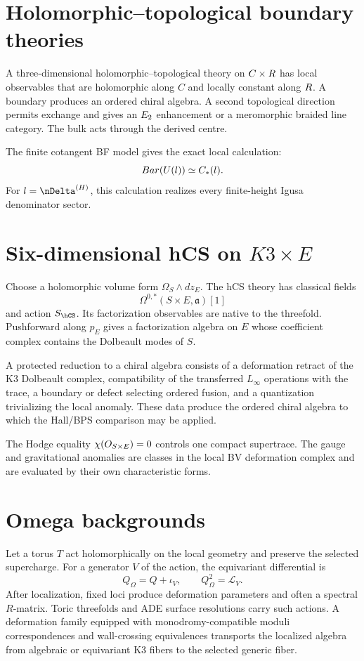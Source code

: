 \chapter{Holomorphic--topological boundary theories}
A three-dimensional holomorphic--topological theory on $C\times R$ has local observables that are holomorphic along $C$ and locally constant along $R$. A boundary produces an ordered chiral algebra. A second topological direction permits exchange and gives an $E_2$ enhancement or a meromorphic braided line category. The bulk acts through the derived centre.

The finite cotangent BF model gives the exact local calculation:
\[
 Bar(U(l))\simeq C_*(l).
\]
For $\mathfrak l=\nDelta^{(H)}$, this calculation realizes every finite-height Igusa denominator sector.

\chapter{Six-dimensional hCS on \texorpdfstring{$K3\times E$}{K3 x E}}
Choose a holomorphic volume form $\Omega_S\wedge dz_E$. The hCS theory has classical fields
\[
 \Omega^{0,*}(S\times E,\mathfrak a)[1]
\]
and action $S_{\hCS}$. Its factorization observables are native to the threefold. Pushforward along $p_E$ gives a factorization algebra on $E$ whose coefficient complex contains the Dolbeault modes of $S$.

A protected reduction to a chiral algebra consists of a deformation retract of the K3 Dolbeault complex, compatibility of the transferred $L_\infty$ operations with the trace, a boundary or defect selecting ordered fusion, and a quantization trivializing the local anomaly. These data produce the ordered chiral algebra to which the Hall/BPS comparison may be applied.

The Hodge equality $\chi(O_{S\times E})=0$ controls one compact supertrace. The gauge and gravitational anomalies are classes in the local BV deformation complex and are evaluated by their own characteristic forms.

\chapter{Omega backgrounds}
Let a torus $T$ act holomorphically on the local geometry and preserve the selected supercharge. For a generator $V$ of the action, the equivariant differential is
\[
 Q_\Omega=Q+\iota_V,
 \qquad Q_\Omega^2=\mathcal L_V.
\]
After localization, fixed loci produce deformation parameters and often a spectral $R$-matrix. Toric threefolds and ADE surface resolutions carry such actions. A deformation family equipped with monodromy-compatible moduli correspondences and wall-crossing equivalences transports the localized algebra from algebraic or equivariant K3 fibers to the selected generic fiber.

